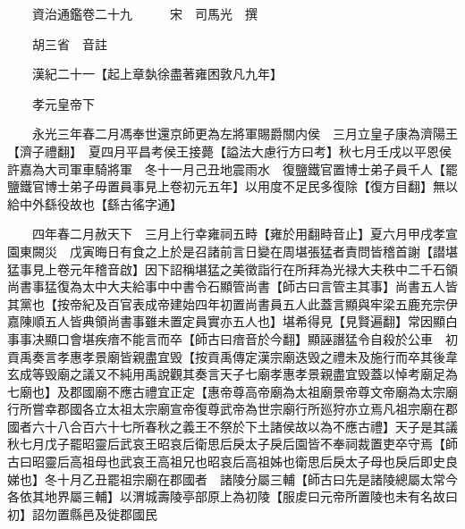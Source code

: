 










 


 
 


 

  
  
  
  
  





  
  
  
  
  
 
  

  

  
  
  



  

 
 

  
   




  

  
  


  　　資治通鑑卷二十九　　　宋　司馬光　撰

　　胡三省　音註

　　漢紀二十一【起上章埶徐盡著雍困敦凡九年】

　　孝元皇帝下

　　永光三年春二月馮奉世還京師更為左將軍賜爵關内侯　三月立皇子康為濟陽王【濟子禮翻】　夏四月平昌考侯王接薨【謚法大慮行方曰考】秋七月壬戌以平恩侯許嘉為大司軍車騎將軍　冬十一月己丑地震雨水　復鹽鐵官置博士弟子員千人【罷鹽鐵官博士弟子毋置員事見上卷初元五年】以用度不足民多復除【復方目翻】無以給中外繇役故也【繇古徭字通】

　　四年春二月赦天下　三月上行幸雍祠五畤【雍於用翻畤音止】夏六月甲戌孝宣園東闕災　戊寅晦日有食之上於是召諸前言日變在周堪張猛者責問皆稽首謝【譛堪猛事見上卷元年稽音啟】因下詔稱堪猛之美徵詣行在所拜為光禄大夫秩中二千石領尚書事猛復為太中大夫給事中中書令石顯管尚書【師古曰言管主其事】尚書五人皆其黨也【按帝紀及百官表成帝建始四年初置尚書員五人此蓋言顯與牢梁五鹿充宗伊嘉陳順五人皆典領尚書事雖未置定員實亦五人也】堪希得見【見賢遍翻】常因顯白事事决顯口會堪疾瘖不能言而卒【師古曰瘖音於今翻】顯誣譖猛令自殺於公車　初貢禹奏言孝惠孝景廟皆親盡宜毁【按貢禹傳定漢宗廟迭毁之禮未及施行而卒其後韋玄成等毁廟之議又不純用禹說觀其奏言天子七廟孝惠孝景親盡宜毁蓋以悼考廟足為七廟也】及郡國廟不應古禮宜正定【惠帝尊高帝廟為太祖廟景帝尊文帝廟為太宗廟行所嘗幸郡國各立太祖太宗廟宣帝復尊武帝為世宗廟行所廵狩亦立焉凡祖宗廟在郡國者六十八合百六十七所春秋之義王不祭於下土諸侯故以為不應古禮】天子是其議秋七月戊子罷昭靈后武哀王昭哀后衛思后戾太子戾后園皆不奉祠裁置吏卒守焉【師古曰昭靈后高祖母也武哀王高祖兄也昭哀后高祖姊也衛思后戾太子母也戾后即史良娣也】冬十月乙丑罷祖宗廟在郡國者　諸陵分屬三輔【師古曰先是諸陵總屬太常今各依其地界屬三輔】以渭城壽陵亭部原上為初陵【服䖍曰元帝所置陵也未有名故曰初】詔勿置縣邑及徙郡國民

